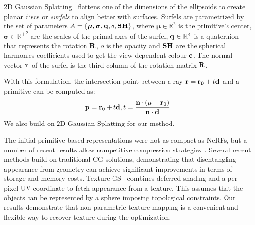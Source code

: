 2D Gaussian Splatting~\cite{2dgs} flattens one of the dimensions of the ellipsoids to create planar discs or \emph{surfels} to align better with surfaces. 
Surfels are parametrized by the set of parameters $A=\{\boldsymbol{\mu}, \boldsymbol {\sigma}, \mathbf{q}, o, \mathbf{SH}\}$,
where $\boldsymbol{\mu} \in \mathbb{R}^3$ is the primitive's center,
$\boldsymbol{\sigma} \in \mathbb{R^+}^2$ are the scales of the primal axes of the surfel,
$\mathbf{q} \in \mathbb{R}^4$ is a quaternion that represents the rotation $\mathbf{R}$,
$o$ is the opacity and
$\mathbf{SH}$ are the spherical harmonics coefficients used to get the view-dependent colour $\mathbf{c}$.
The normal vector $\mathbf{n}$ of the surfel is the third column of the rotation matrix $\mathbf{R}$.

With this formulation, the intersection point between a ray $\mathbf{r} = \mathbf{r_0} + t\mathbf{d}$ and a primitive can be computed as:
\begin{equation}\label{eq:intersection_point}
\mathbf{p} = \mathbf{r}_0 + t\mathbf{d}, t = \frac{\mathbf{n} \cdot (\mathbf{\mu} - \mathbf{r}_0)}{\mathbf{n} \cdot \mathbf{d}}
\end{equation}
We also build on 2D Gaussian Splatting for our method.

The initial primitive-based representations were not as compact as NeRFs, but a number of recent results allow competitive compression strategies~\cite{3dgszip}. Several recent methods build on traditional CG solutions, demonstrating that disentangling appearance from geometry can achieve significant improvements in terms of storage and memory costs.  Texture-GS~\cite{uv3dgs} combines deferred shading and a per-pixel UV coordinate to fetch appearance from a texture. This assumes that the objects can be represented by a sphere imposing topological constraints. Our results demonstrate that non-parametric texture mapping is a convenient and flexible way to recover texture during the optimization. 

